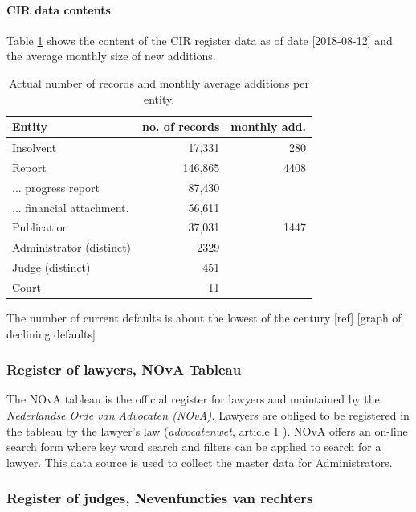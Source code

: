 \paragraph{CIR data contents}
Table \ref{table:cir_contents} shows the content of the CIR register data as of date [2018-08-12] and the average monthly size of new additions.

\begin{table}[h]
\caption{Actual number of records and monthly average additions per entity.}
\centering
\begin{tabular}{l r r}
\hline\hline
Entity & no. of records & monthly add.\\
\hline
Insolvent & 17,331 & 280 \\
Report & 146,865 & 4408 \\
... progress report & 87,430 &  \\
... financial attachment. & 56,611 &  \\
Publication & 37,031 & 1447 \\
Administrator (distinct) & 2329 & \\
Judge (distinct) & 451 & \\
Court & 11 & \\
\hline
\end{tabular}
\label{table:cir_contents}
\end{table}

The number of current defaults is about the lowest of the century [ref] [graph of declining defaults]

\subsubsection{Register of lawyers, NOvA Tableau}\label{NOvA Tableau}

The NOvA tableau is the official register for lawyers and maintained by the \textit{Nederlandse Orde van Advocaten (NOvA)}\cite{nova:1}. Lawyers are obliged to be registered in the tableau by the lawyer's law (\textit{advocatenwet}, article 1 \cite{law:2}). NOvA offers an on-line search form where key word search and filters can be applied to search for a lawyer. This data source is used to collect the master data for Administrators. 

\subsubsection{Register of judges, Nevenfuncties van rechters}\label{Nevenfuncties Rechters}

